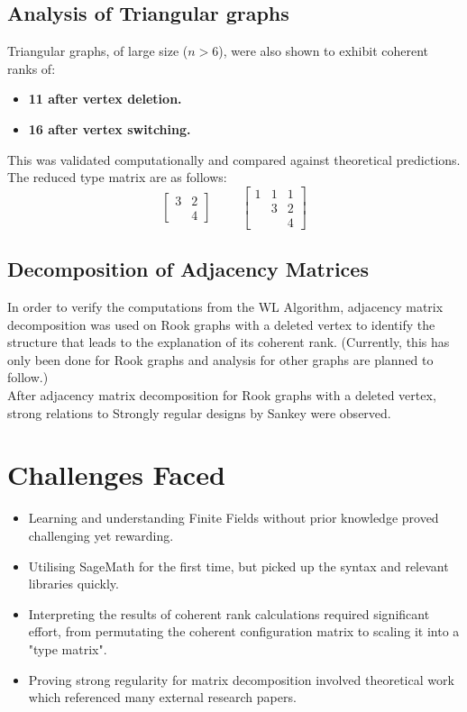 \documentclass[12pt]{article}
\begin{document}
\subsection{Analysis of Triangular graphs}
Triangular graphs, of large size ($n > 6$), were also shown to exhibit coherent ranks of:
\begin{itemize}
    \item \textbf{11 after vertex deletion.}
    \item \textbf{16 after vertex switching.}
\end{itemize}
This was validated computationally and compared against theoretical predictions.
The reduced type matrix are as follows:
\[
\begin{bmatrix}
  3 & 2 \\
    & 4
\end{bmatrix}
\hspace{1cm}
\begin{bmatrix}
  1 & 1 & 1 \\
    & 3 & 2 \\
    &   & 4
\end{bmatrix}
\]

\subsection{Decomposition of Adjacency Matrices}
In order to verify the computations from the WL Algorithm, adjacency matrix decomposition was used on Rook graphs with a deleted vertex to identify the structure that leads to the explanation of its coherent rank. (Currently, this has only been done for Rook graphs and analysis for other graphs are planned to follow.) \\
After adjacency matrix decomposition for Rook graphs with a deleted vertex, strong relations to Strongly regular designs \cite{sankey_srd} by Sankey were observed.

\section{Challenges Faced}
\begin{itemize}
    \item Learning and understanding Finite Fields without prior knowledge proved challenging yet rewarding.
    \item Utilising SageMath for the first time, but picked up the syntax and relevant libraries quickly.
    \item Interpreting the results of coherent rank calculations required significant effort, from permutating the coherent configuration matrix to scaling it into a "type matrix".
    \item Proving strong regularity for matrix decomposition involved theoretical work which referenced many external research papers.
\end{itemize}
\end{document}
